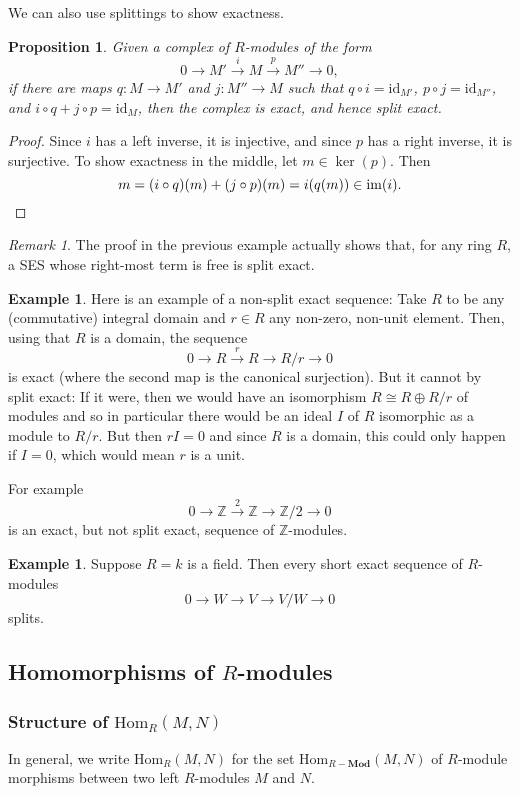 \documentclass{amsart}[12pt]
\def\image{\operatorname{im}}
\def\im{\image}
\def\ker{\operatorname{ker}}
\newcommand{\Hom}{\mathrm{Hom}}
\newcommand{\id}{\mathrm{id}}
\newcommand{\Z}{\mathbb{Z}}
\newcommand{\Def}[1]{#1 \index{#1}}
\numberwithin{equation}{section}
\theoremstyle{plain} %
\newtheorem{prop}[equation]{Proposition}
\theoremstyle{definition}
\newtheorem{ex}[equation]{Example}
\theoremstyle{remark}
\newtheorem{rem}[equation]{Remark}
\newcommand{\ssec}[1]{\subsection{#1}}
\newcommand{\sssec}[1]{\subsubsection{#1}}
\newcommand{\xra}[1]{\xrightarrow{#1}}
\newcommand{\Mod}[1]{#1-\mathbf{Mod}}
\begin{document}
We can also use splittings to show exactness.

\begin{prop}
Given a complex of $R$-modules of the form
\[0 \to M' \xra{i} M \xra{p} M'' \to 0,\]
if there are maps 
$q: M \to M'$ and $j: M'' \to M$ such that 
$q \circ i = \id_{M'}$, 
$p \circ j = \id_{M''}$, and
$i \circ q + j \circ p = \id_M$, then
the complex is exact, and hence split exact.
\end{prop}
\begin{proof}
Since $i$ has a left inverse, it is injective, and since $p$ has a right inverse, it is surjective. To show exactness in the middle, let $m\in \ker(p)$. Then \[m= (i\circ q)(m) + (j\circ p)(m) = i(q(m))\in \im(i).\qedhere\]
\end{proof}






\begin{rem} The proof in the previous example actually shows that, for any ring $R$, a   SES whose right-most term is free is split exact.
\end{rem}




\begin{ex} Here is an example of a non-split exact sequence: 
Take $R$ to be any (commutative) integral domain and $r \in R$ any non-zero, non-unit element. Then, using that $R$ is a domain, the
sequence
$$
0 \to R \xra{r} R \to R/r \to 0
$$
is exact (where the second map is the canonical surjection).
But it cannot by split exact: If it were, then we would have an isomorphism $R \cong R \oplus R/r$ of modules
and so in particular there would be an ideal $I$ of $R$ isomorphic as a module to $R/r$. But then  $r I = 0$ and since $R$ is a domain, 
this could only happen if $I = 0$, which would mean $r$ is a unit.

For example
$$
0 \to \Z \xra{2} \Z \to \Z/2 \to 0
$$
is an exact, but not split exact, sequence of $\Z$-modules.
\end{ex}

\begin{ex} Suppose $R = k$ is a field. Then every short exact sequence of $R$-modules 
\[0 \to W\to V \to V/W \to 0\]
splits.
\end{ex}




\ssec{Homomorphisms of $R$-modules}

\sssec{Structure of $\Hom_R(M,N)$}

In general, we write \Def{$\Hom_R(M,N)$} for the set $\Hom_{\Mod{R}}(M,N)$ of $R$-module morphisms between two left $R$-modules $M$ and $N$.
\end{document}

